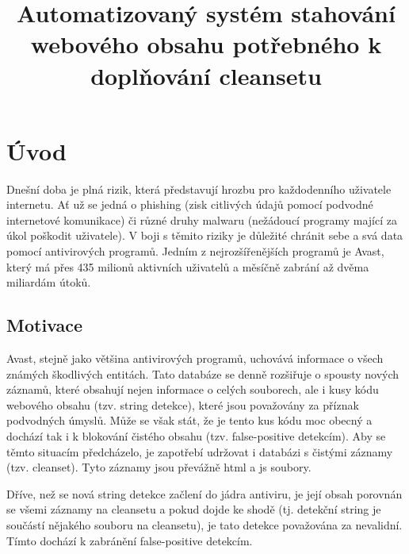 \documentclass[thesis=M,czech,hidelinks]{FITthesis}[2013/05/06]
\title{Automatizovaný systém stahování webového obsahu potřebného k doplňování cleansetu}
\begin{document}





\chapter{Úvod}
Dnešní doba je plná rizik, která představují hrozbu pro každodenního uživatele internetu. Ať už se jedná o phishing (zisk citlivých údajů pomocí podvodné internetové komunikace) či různé druhy malwaru (nežádoucí programy mající za úkol poškodit uživatele). V boji s těmito riziky je důležité chránit sebe a svá data pomocí antivirových programů. Jedním z nejrozšířenějších programů je Avast, který má přes 435 milionů aktivních uživatelů a měsíčně zabrání až dvěma miliardám útoků\cite{avast_flier}.

\section{Motivace}
Avast, stejně jako většina antivirových programů, uchovává informace o všech známých škodlivých entitách. Tato databáze se denně rozšiřuje o spousty nových záznamů, které obsahují nejen informace o celých souborech, ale i kusy kódu webového obsahu (tzv. string detekce), které jsou považovány za příznak podvodných úmyslů. Může se však stát, že je tento kus kódu moc obecný a dochází tak i k blokování čistého obsahu (tzv. false-positive detekcím). Aby se těmto situacím předcházelo, je zapotřebí udržovat i databázi s čistými záznamy (tzv. cleanset). Tyto záznamy jsou převážně html a js soubory.

Dříve, než se nová string detekce začlení do jádra antiviru, je její obsah porovnán se všemi záznamy na cleansetu a pokud dojde ke shodě (tj. detekční string je součástí nějakého souboru na cleansetu), je tato detekce považována za nevalidní. Tímto dochází k zabránění false-positive detekcím. 
\end{document}
